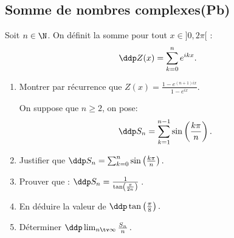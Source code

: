 \subsection{Somme de nombres complexes(Pb)}
\begin{exercice}
 Soit  $n\in \N$. On définit la somme pour tout $x \in ]0, 2\pi[$ :
$$\ddp Z(x) =\sum_{k=0}^n e^{ikx}.$$
\begin{enumerate}
\item Montrer par récurrence que $Z(x) = \frac{1-e^{(n+1)ix}}{1-e^{ix}}$.

On suppose que $n\geq 2$, on pose: 
$$\ddp S_n = \sum_{k=1}^{n-1} \sin \left( \frac{k\pi}{n}\right).$$
\item Justifier que $\ddp S_n = \sum_{k=0}^{n} \sin \left( \frac{k\pi}{n}\right).$\\
\item Prouver que : $\ddp S_n = \frac{1}{ \tan \left( \frac{\pi}{2n}\right)}\, $.\\
\item En déduire la valeur de $\ddp \tan \left( \frac{\pi}{8}\right).$\\
\item Déterminer $\ddp \lim_{n\tv \infty} \frac{S_n}{n}\, .$
\end{enumerate}
\end{exercice}


